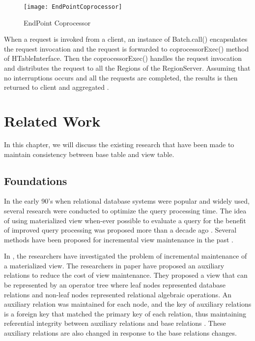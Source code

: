 \documentclass[11pt,a4paper,bibtotoc,idxtotoc,headsepline,footsepline,footexclude,BCOR12mm,DIV13]{scrbook}
\begin{document}
\begin{figure}
    \centering
    \texttt{[image: EndPointCoprocessor]}
    \caption{EndPoint Coprocessor}
    
\end{figure}

When a request is invoked from a client, an instance of Batch.call() encapsulates the request invocation and the request is forwarded to coprocessorExec() method of HTableInterface. Then the coprocessorExec() handles the request invocation and distributes the request to all the Regions of the RegionServer. Assuming that no interruptions occurs and all the requests are completed, the results is then returned to client and aggregated \cite{coprocessor:detail}.


\chapter{Related Work}
\label{chap:relatedwork}
In this chapter, we will discuss the existing research that have been made to maintain consistency between base table and view table.

\section{Foundations}
\label{Foundations}
In the early 90's when relational database systems were popular and widely used, several research were conducted to optimize the query processing time. The idea of using materialized view when-ever possible to evaluate a query for the benefit of improved query processing was proposed more than a decade ago \cite{maintenance:optimizingqueries}. Several methods have been proposed for incremental view maintenance in the past \cite{blakeley:efficiently, gupta:maintaining, agrawal:efficient}.

In \cite{incremental:materializedviews}, the researchers have investigated the problem of incremental maintenance of a materialized view. The researchers in paper \cite{incremental:materializedviews} have proposed an auxiliary relations to reduce the cost of view maintenance. They proposed a view that can be represented by an operator tree \cite{database:concepts} where leaf nodes represented database relations and non-leaf nodes represented relational algebraic operations. An auxiliary relation was maintained for each node, and the key of auxiliary relations is a foreign key that matched the primary key of each relation, thus maintaining referential integrity between auxiliary relations and base relations \cite{database:concepts}. These auxiliary relations are also changed in response to the base relations changes.
\end{document}

